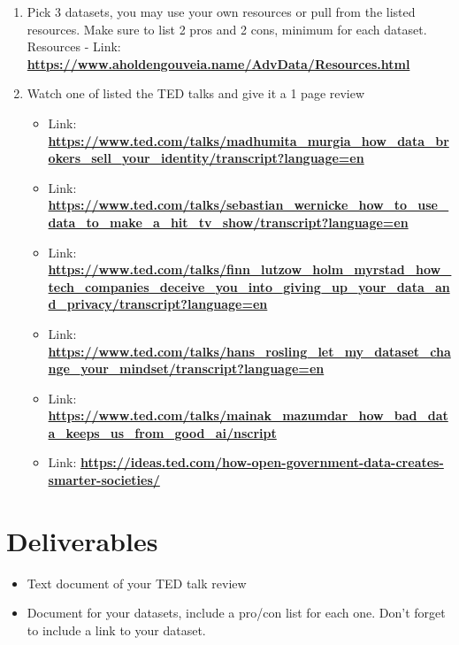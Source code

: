 \documentclass[12pt]{article}
\begin{document}
    \begin{enumerate}
        \item Pick 3 datasets, you may use your own resources or pull from the listed resources.  Make sure to list 2 pros and 2 cons, minimum for each dataset.  Resources - Link: \href{https://www.aholdengouveia.name/AdvData/Resources.html}{\textbf{https://www.aholdengouveia.name/AdvData/Resources.html}}
        \item Watch one of listed the TED talks and give it a 1 page review
            \begin{itemize}
                \item  Link: \href{https://www.ted.com/talks/madhumita_murgia_how_data_brokers_sell_your_identity/transcript?language=en}{\textbf{https://www.ted.com/talks/madhumita_murgia_how_data_brokers_sell_your_identity/transcript?language=en}}
                \item Link: \href{https://www.ted.com/talks/sebastian_wernicke_how_to_use_data_to_make_a_hit_tv_show/transcript?language=en}{\textbf{https://www.ted.com/talks/sebastian_wernicke_how_to_use_data_to_make_a_hit_tv_show/transcript?language=en}}
                \item Link: \href{https://www.ted.com/talks/finn_lutzow_holm_myrstad_how_tech_companies_deceive_you_into_giving_up_your_data_and_privacy/transcript?language=en}{\textbf{https://www.ted.com/talks/finn_lutzow_holm_myrstad_how_tech_companies_deceive_you_into_giving_up_your_data_and_privacy/transcript?language=en}}
                \item Link: \href{https://www.ted.com/talks/hans_rosling_let_my_dataset_change_your_mindset/transcript?language=en}{\textbf{https://www.ted.com/talks/hans_rosling_let_my_dataset_change_your_mindset/transcript?language=en}} 
                \item Link: \href{https://www.ted.com/talks/mainak_mazumdar_how_bad_data_keeps_us_from_good_ai/nscript}{\textbf{https://www.ted.com/talks/mainak_mazumdar_how_bad_data_keeps_us_from_good_ai/nscript}} 
                \item Link: \href{https://ideas.ted.com/how-open-government-data-creates-smarter-societies/}{\textbf{https://ideas.ted.com/how-open-government-data-creates-smarter-societies/}}
            \end{itemize}
    \end{enumerate}



\section*{Deliverables}
\begin{itemize}
    \item Text document of your TED talk review
    \item Document for your datasets, include a pro/con list for each one.  Don't forget to include a link to your dataset.
\end{itemize}
\end{document}
